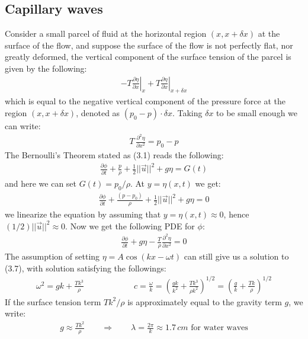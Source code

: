 \documentclass[11pt]{book}
\theoremstyle{break}
\theoremstyle{break}
\begin{document}
\subsection{Capillary waves}
Consider a small parcel of fluid at the horizontal region $(x, x+\delta x)$ at the surface of the flow, and suppose the surface of the flow is not perfectly flat, nor greatly deformed, the vertical component of the surface tension of the parcel is given by the following:
\begin{align*}
-T \left.\frac{\partial \eta}{\partial x}\right|_x + T \left.\frac{\partial \eta}{\partial x}\right|_{x+\delta x}
\end{align*}
which is equal to the negative vertical component of the pressure force at the region $(x,x+\delta x)$, denoted as $(p_0 - p)\cdot \delta x$. Taking $\delta x$ to be small enough we can write:
\begin{align*}
T \, \frac{\partial^2 \eta}{\partial x^2} = p_0 - p
\end{align*}
The Bernoulli's Theorem stated as (3.1) reads the following:
\begin{align*}
\frac{\partial \phi}{\partial t} + \frac{p}{\rho} + \frac{1}{2}||\vec{u}||^2 + g\eta = G(t)
\end{align*}
and here we can set $G(t) = p_0 / \rho$. At $y = \eta(x,t)$ we get:
\begin{align*}
\frac{\partial \phi}{\partial t} +\frac{(p-p_0)}{\rho} + \frac{1}{2}||\vec{u}||^2 + g\eta = 0
\end{align*}
we linearize the equation by assuming that $y = \eta(x,t) \approx 0$, hence $(1/2)||\vec{u}||^2 \approx 0$. Now we get the following PDE for $\phi$:
\begin{align}
\frac{\partial \phi}{\partial t} + g\eta - \frac{T}{\rho}\frac{\partial^2 \eta}{\partial x^2} = 0
\end{align}
The assumption of setting $\eta = A\cos(kx-\omega t)$ can still give us a solution to (3.7), with solution satisfying the followings:
\begin{align*}
\omega^2 = gk+\frac{Tk^3}{\rho} \qquad\qquad\qquad c=\frac{\omega}{k} = \left( \frac{gk}{k^2} + \frac{Tk^3}{\rho k^2}\right)^{1/2} = \left( \frac{g}{k}+ \frac{Tk}{\rho}\right)^{1/2}
\end{align*}
If the surface tension term $Tk^2/\rho$ is approximately equal to the gravity term $g$, we write:
\begin{align*}
g \approx \frac{Tk^2}{\rho } \qquad \Rightarrow \qquad \lambda = \frac{2\pi }{k} \approx 1.7\, cm \text{ for water waves}
\end{align*}
\end{document}
